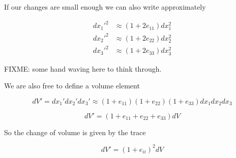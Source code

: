 If our changes are small enough we can also write approximately

\begin{align}\label{eqn:continuumL2:n}
{dx_1'}^2 &\approx (1 + 2 e_{11}) dx_1^2 \\
{dx_2'}^2 &\approx (1 + 2 e_{22}) dx_2^2 \\
{dx_3'}^2 &\approx (1 + 2 e_{33}) dx_3^2
\end{align}

FIXME: some hand waving here to think through.

We are also free to define a volume element

\begin{equation}\label{eqn:continuumL2:n}
dV' = 
dx_1'
dx_2'
dx_3'
\approx
(1 + e_{11})
(1 + e_{22})
(1 + e_{33})
dx_1 dx_2 dx_3
\end{equation}

\begin{equation}\label{eqn:continuumL2:n}
dV' = (1 + e_{11} +e_{22} +e_{33} ) dV
\end{equation}

So the change of volume is given by the trace

\begin{equation}\label{eqn:continuumL2:n}
dV' = ( 1 + e_{ii} )^2 dV
\end{equation}

\EndArticle
